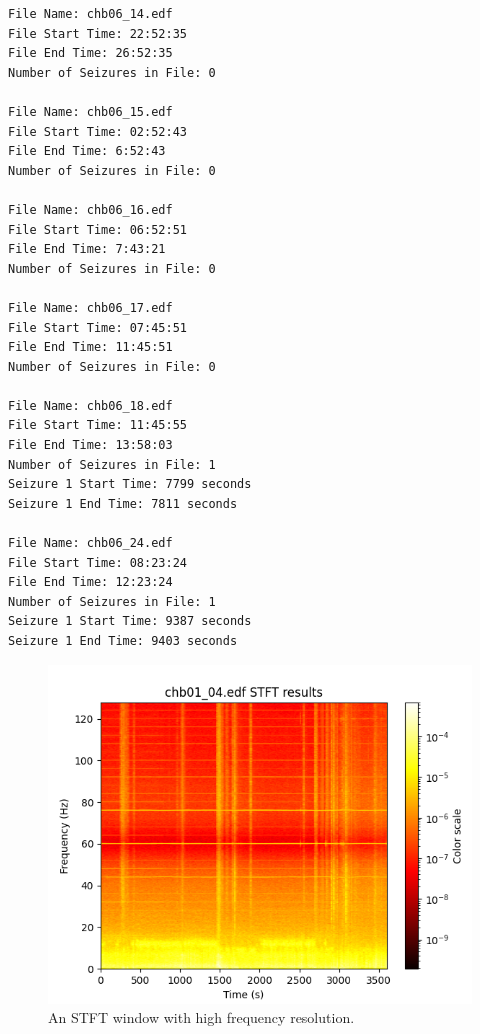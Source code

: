 \documentclass[12pt]{article}
\begin{document}
\begin{lstlisting}[style=logstyle, caption={Example Summary file from the \acrshort{chb} \acrshort{eeg} dataset.}, label={lst:summary-file}]
File Name: chb06_14.edf
File Start Time: 22:52:35
File End Time: 26:52:35
Number of Seizures in File: 0

File Name: chb06_15.edf
File Start Time: 02:52:43
File End Time: 6:52:43
Number of Seizures in File: 0

File Name: chb06_16.edf
File Start Time: 06:52:51
File End Time: 7:43:21
Number of Seizures in File: 0

File Name: chb06_17.edf
File Start Time: 07:45:51
File End Time: 11:45:51
Number of Seizures in File: 0

File Name: chb06_18.edf
File Start Time: 11:45:55
File End Time: 13:58:03
Number of Seizures in File: 1
Seizure 1 Start Time: 7799 seconds
Seizure 1 End Time: 7811 seconds

File Name: chb06_24.edf
File Start Time: 08:23:24
File End Time: 12:23:24
Number of Seizures in File: 1
Seizure 1 Start Time: 9387 seconds
Seizure 1 End Time: 9403 seconds
\end{lstlisting}


\begin{figure}[H]
\includegraphics[width=\textwidth]{stft1}
\centering
\caption{An STFT window with high frequency resolution.}
\label{fig:stft1}
\end{figure}
\end{document}
